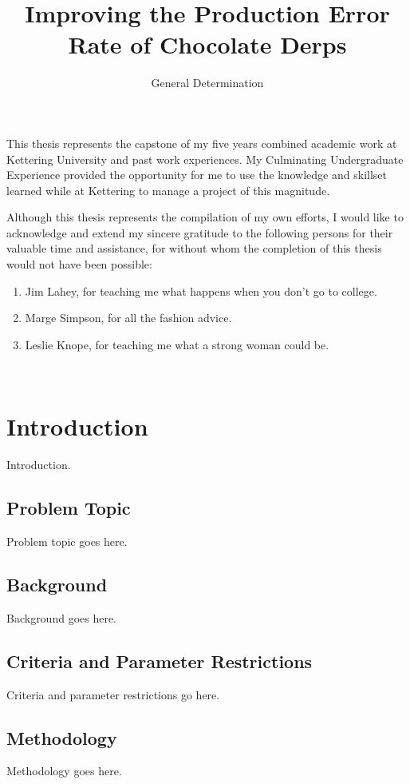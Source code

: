 \documentclass{kuthesis}
\title{Improving the Production Error Rate of Chocolate Derps}
\author{General Determination}
\begin{document}
\maketitlecoop

\begin{preface}
This thesis represents the capstone of my five years combined academic work 
at Kettering University and past work experiences.  My Culminating 
Undergraduate Experience provided the opportunity for me to use the 
knowledge and skillset learned while at Kettering to manage a project 
of this magnitude.

Although this thesis represents the compilation of my own efforts, I would 
like to acknowledge and extend my sincere gratitude to the following persons 
for their valuable time and assistance, for without whom the completion of 
this thesis would not have been possible:

\begin{enumerate}
  \item Jim Lahey, for teaching me what happens when you don't go to college.
  \item Marge Simpson, for all the fashion advice.
  \item Leslie Knope, for teaching me what a strong woman could be.
\end{enumerate}
\end{preface}

\singlespacing
\tableofcontents\
\listofillustrations

\begincontent

\chapter{Introduction}
Introduction.
\section{Problem Topic}
Problem topic goes here.
\section{Background}
Background goes here.
\section{Criteria and Parameter Restrictions}
Criteria and parameter restrictions go here.
\section{Methodology}
Methodology goes here.
\end{document}

